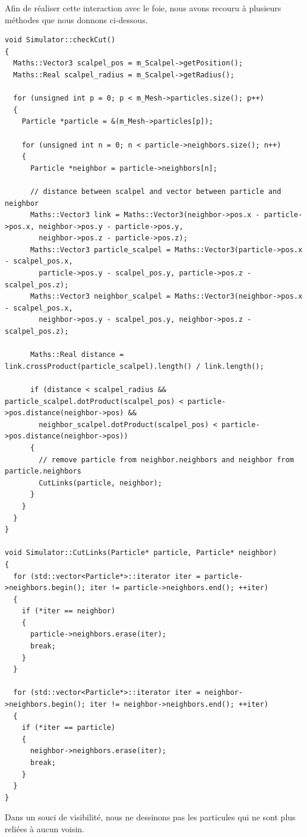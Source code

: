 \documentclass[a4paper,12pt]{article}
\begin{document}
Afin de réaliser cette interaction avec le foie, nous avons recouru à plusieurs méthodes que nous donnons ci-dessous.
\begin{lstlisting}
void Simulator::checkCut() 
{
  Maths::Vector3 scalpel_pos = m_Scalpel->getPosition();
  Maths::Real scalpel_radius = m_Scalpel->getRadius();

  for (unsigned int p = 0; p < m_Mesh->particles.size(); p++)
  {
    Particle *particle = &(m_Mesh->particles[p]);

    for (unsigned int n = 0; n < particle->neighbors.size(); n++)
    {
      Particle *neighbor = particle->neighbors[n];
      
      // distance between scalpel and vector between particle and neighbor
      Maths::Vector3 link = Maths::Vector3(neighbor->pos.x - particle->pos.x, neighbor->pos.y - particle->pos.y, 
        neighbor->pos.z - particle->pos.z);
      Maths::Vector3 particle_scalpel = Maths::Vector3(particle->pos.x - scalpel_pos.x, 
        particle->pos.y - scalpel_pos.y, particle->pos.z - scalpel_pos.z);
      Maths::Vector3 neighbor_scalpel = Maths::Vector3(neighbor->pos.x - scalpel_pos.x, 
        neighbor->pos.y - scalpel_pos.y, neighbor->pos.z - scalpel_pos.z);
      
      Maths::Real distance = link.crossProduct(particle_scalpel).length() / link.length();

      if (distance < scalpel_radius && particle_scalpel.dotProduct(scalpel_pos) < particle->pos.distance(neighbor->pos) && 
        neighbor_scalpel.dotProduct(scalpel_pos) < particle->pos.distance(neighbor->pos))
      {
        // remove particle from neighbor.neighbors and neighbor from particle.neighbors
        CutLinks(particle, neighbor);
      }
    }
  }
}

void Simulator::CutLinks(Particle* particle, Particle* neighbor)
{
  for (std::vector<Particle*>::iterator iter = particle->neighbors.begin(); iter != particle->neighbors.end(); ++iter)
  {
    if (*iter == neighbor)
    {
      particle->neighbors.erase(iter);
      break;
    }
  }

  for (std::vector<Particle*>::iterator iter = neighbor->neighbors.begin(); iter != neighbor->neighbors.end(); ++iter)
  {
    if (*iter == particle)
    {
      neighbor->neighbors.erase(iter);
      break;
    }
  }
}
\end{lstlisting}

Dans un souci de visibilité, nous ne dessinons pas les particules qui ne sont plus reliées à aucun voisin. 
\end{document}
